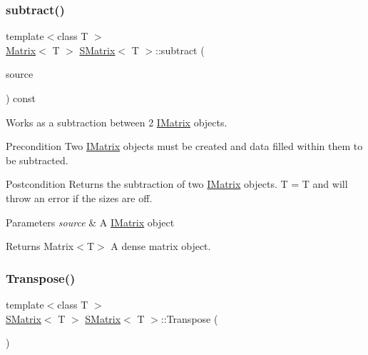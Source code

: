 \subsubsection{\texorpdfstring{subtract()}{subtract()}\hspace{0.1cm}{\footnotesize\ttfamily [6/6]}}
{\footnotesize\ttfamily template$<$class T $>$ \\
\mbox{\hyperlink{class_matrix}{Matrix}}$<$ T $>$ \mbox{\hyperlink{class_s_matrix}{S\+Matrix}}$<$ T $>$\+::subtract (\begin{DoxyParamCaption}\item[{const \mbox{\hyperlink{class_i_matrix}{I\+Matrix}}$<$ \mbox{\hyperlink{class_d_matrix}{D\+Matrix}}$<$ T $>$, T $>$ \&}]{source }\end{DoxyParamCaption}) const}



Works as a subtraction between 2 \mbox{\hyperlink{class_i_matrix}{I\+Matrix}} objects. 

\begin{DoxyPrecond}{Precondition}
Two \mbox{\hyperlink{class_i_matrix}{I\+Matrix}} objects must be created and data filled within them to be subtracted. 
\end{DoxyPrecond}
\begin{DoxyPostcond}{Postcondition}
Returns the subtraction of two \mbox{\hyperlink{class_i_matrix}{I\+Matrix}} objects. T = T and will throw an error if the sizes are off.
\end{DoxyPostcond}

\begin{DoxyParams}{Parameters}
{\em source} & A \mbox{\hyperlink{class_i_matrix}{I\+Matrix}} object \\
\hline
\end{DoxyParams}
\begin{DoxyReturn}{Returns}
Matrix$<$\+T$>$ A dense matrix object. 
\end{DoxyReturn}
\mbox{\label{class_s_matrix_a55030aa83eaefc452d2fdf28fc38391c}} 
\subsubsection{\texorpdfstring{Transpose()}{Transpose()}}
{\footnotesize\ttfamily template$<$class T $>$ \\
\mbox{\hyperlink{class_s_matrix}{S\+Matrix}}$<$ T $>$ \mbox{\hyperlink{class_s_matrix}{S\+Matrix}}$<$ T $>$\+::Transpose (\begin{DoxyParamCaption}{ }\end{DoxyParamCaption})}



